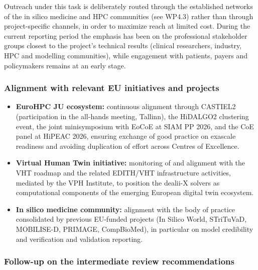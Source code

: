 \documentclass[a4paper,12pt, numbers]{article}
\begin{document}
Outreach under this task is deliberately routed through the established networks of the
in silico medicine and HPC communities (see WP4.3) rather than through project-specific
channels, in order to maximize reach at limited cost. During the current reporting period
the emphasis has been on the professional stakeholder groups closest to the project's
technical results (clinical researchers, industry, HPC and modelling communities), while
engagement with patients, payers and policymakers remains at an early stage.



\subsubsection*{Alignment with relevant EU initiatives and projects}

\begin{itemize}[left=1em, itemsep=0pt, topsep=0pt]
\item \textbf{EuroHPC JU ecosystem:} continuous alignment through CASTIEL2 (participation in the all-hands meeting, Tallinn), the HiDALGO2 clustering event, the joint minisymposium with EoCoE at SIAM PP 2026, and the CoE panel at HiPEAC 2026, ensuring exchange of good practice on exascale readiness and avoiding duplication of effort across Centres of Excellence.
\item \textbf{Virtual Human Twin initiative:} monitoring of and alignment with the VHT roadmap and the related EDITH/VHT infrastructure activities, mediated by the VPH Institute, to position the dealii-X solvers as computational components of the emerging European digital twin ecosystem.
\item \textbf{In silico medicine community:} alignment with the body of practice consolidated by previous EU-funded projects (In Silico World, STriTuVaD, MOBILISE-D, PRIMAGE, CompBioMed), in particular on model credibility and verification and validation reporting.
\end{itemize}

\subsubsection*{Follow-up on the intermediate review recommendations}
\end{document}
